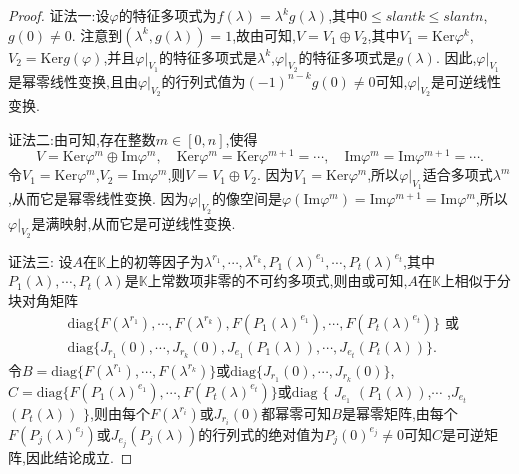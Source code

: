 \documentclass[../../main.tex]{subfiles}
\begin{document}
\begin{proof}
{\color{blue}证法一:}设$\varphi$的特征多项式为$f(\lambda)=\lambda^kg(\lambda)$,其中$0\leqslant slant k\leqslant slant n$,$g(0)\neq 0$. 注意到$(\lambda^k,g(\lambda)) = 1$,故由可知,$V = V_1\oplus V_2$,其中$V_1=\mathrm{Ker}\varphi^k$,$V_2=\mathrm{Ker}g(\varphi)$,并且$\varphi|_{V_1}$的特征多项式是$\lambda^k$,$\varphi|_{V_2}$的特征多项式是$g(\lambda)$. 因此,$\varphi|_{V_1}$是幂零线性变换,且由$\varphi|_{V_2}$的行列式值为$(-1)^{n - k}g(0)\neq 0$可知,$\varphi|_{V_2}$是可逆线性变换.

{\color{blue}证法二:}由可知,存在整数$m\in[0,n]$,使得
\[V=\mathrm{Ker}\varphi^m\oplus\mathrm{Im}\varphi^m,\quad \mathrm{Ker}\varphi^m=\mathrm{Ker}\varphi^{m + 1}=\cdots,\quad \mathrm{Im}\varphi^m=\mathrm{Im}\varphi^{m + 1}=\cdots.\]
令$V_1=\mathrm{Ker}\varphi^m$,$V_2=\mathrm{Im}\varphi^m$,则$V = V_1\oplus V_2$. 因为$V_1=\mathrm{Ker}\varphi^m$,所以$\varphi|_{V_1}$适合多项式$\lambda^m$,从而它是幂零线性变换. 因为$\varphi|_{V_2}$的像空间是$\varphi(\mathrm{Im}\varphi^m)=\mathrm{Im}\varphi^{m + 1}=\mathrm{Im}\varphi^m$,所以$\varphi|_{V_2}$是满映射,从而它是可逆线性变换. 

{\color{blue}证法三:}
设$A$在$\mathbb{K}$上的初等因子为$\lambda^{r_1},\cdots,\lambda^{r_k},P_1(\lambda)^{e_1},\cdots,P_t(\lambda)^{e_t}$,其中$P_1(\lambda),\cdots,P_t(\lambda)$是$\mathbb{K}$上常数项非零的不可约多项式,则由或可知,$A$在$\mathbb{K}$上相似于分块对角矩阵
\begin{align*}
&\mathrm{diag}\{F(\lambda^{r_1}),\cdots,F(\lambda^{r_k}),F(P_1(\lambda)^{e_1}),\cdots,F(P_t(\lambda)^{e_t})\}\text{ 或 }\\
&\mathrm{diag}\{J_{r_1}(0),\cdots,J_{r_k}(0),J_{e_1}(P_1(\lambda)),\cdots,J_{e_t}(P_t(\lambda))\}.
\end{align*}
令$B = \mathrm{diag}\{F(\lambda^{r_1}),\cdots,F(\lambda^{r_k})\}$或$\mathrm{diag}\{J_{r_1}(0),\cdots,J_{r_k}(0)\}$,$C = \mathrm{diag}\{F(P_1(\lambda)^{e_1}),\cdots,F(P_t(\lambda)^{e_t})\}$或$\mathrm{diag}$ $\{$ $J_{e_1}$ $(P_1(\lambda))$,$\cdots$ ,$J_{e_t}$ $(P_t(\lambda))$ $\}$,则由每个$F(\lambda^{r_i})$或$J_{r_i}(0)$都幂零可知$B$是幂零矩阵,由每个$F(P_j(\lambda)^{e_j})$或$J_{e_j}(P_j(\lambda))$的行列式的绝对值为$P_j(0)^{e_j}\neq 0$可知$C$是可逆矩阵,因此结论成立.
\end{proof}

\vspace{0.5cm}
\end{document}
